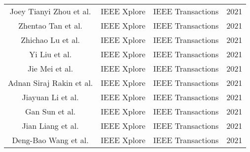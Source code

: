 \begin{center}
\begin{tabular}{cccc}
Joey Tianyi Zhou et al. \cite{joeytianyi2021} & IEEE Xplore & IEEE Transactions & 2021 \\
Zhentao Tan et al. \cite{zhentao2021} & IEEE Xplore & IEEE Transactions & 2021 \\
Zhichao Lu et al. \cite{zhichao2021} & IEEE Xplore & IEEE Transactions & 2021 \\
Yi Liu et al. \cite{yi2021} & IEEE Xplore & IEEE Transactions & 2021 \\
Jie Mei et al. \cite{jie2021} & IEEE Xplore & IEEE Transactions & 2021 \\
Adnan Siraj Rakin et al. \cite{adnansiraj2021} & IEEE Xplore & IEEE Transactions & 2021 \\
Jiayuan Li et al. \cite{jiayuan2021} & IEEE Xplore & IEEE Transactions & 2021 \\
Gan Sun et al. \cite{gan2021} & IEEE Xplore & IEEE Transactions & 2021 \\
Jian Liang et al. \cite{jian2021} & IEEE Xplore & IEEE Transactions & 2021 \\
Deng-Bao Wang et al. \cite{dengbao2021} & IEEE Xplore & IEEE Transactions & 2021 \\
\hline
\end{tabular}
\end{center}



